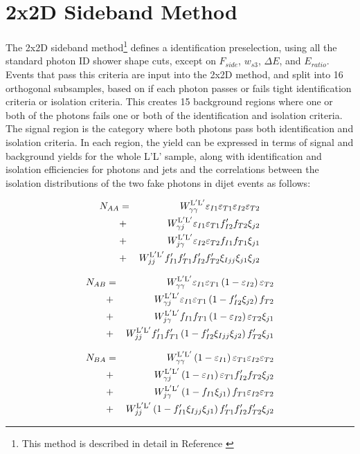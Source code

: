 \chapter{2x2D Sideband Method} \label{app:2x2d}

The 2x2D sideband method\footnote{This method is described in detail in Reference \cite{2x2d-definition}} defines a \LoosePrime identification preselection, using all the standard photon ID shower shape cuts, except on $F_{side}$, $w_{s3}$, $\Delta E$, and $E_{ratio}$. Events that pass this criteria are input into the 2x2D method, and split into 16 orthogonal subsamples, based on if each photon passes or fails tight identification criteria or isolation criteria. This creates 15 background regions where one or both of the photons fails one or both of the identification and isolation criteria. The signal region is the category where both photons pass both identification and isolation criteria. In each region, the yield can be expressed in terms of signal and background yields for the whole L'L' sample, along with identification and isolation efficiencies for photons and jets and the correlations between the isolation distributions of the two fake photons in dijet events as follows:

\begin{eqnarray}
    N_{AA} &=& W_{\gamma\gamma}^{\mathrm{L}^{\prime}\mathrm{L}^{\prime}} \varepsilon_{I1} \varepsilon_{T1} \varepsilon_{I2} \varepsilon_{T2} \nonumber \\
    &+& W_{\gamma j}^{\mathrm{L}^{\prime}\mathrm{L}^{\prime}} \varepsilon_{I1} \varepsilon_{T1} f^{\prime}_{I2} f_{T2} \xi_{j2} \nonumber \\
    &+& W_{j \gamma}^{\mathrm{L}^{\prime}\mathrm{L}^{\prime}} \varepsilon_{I2} \varepsilon_{T2} f_{I1} f_{T1} \xi_{j1}  \nonumber \\
    &+& W_{jj}^{\mathrm{L}^{\prime}\mathrm{L}^{\prime}} f^{\prime}_{I1} f^{\prime}_{T1} f^{\prime}_{I2} f^{\prime}_{T2} \xi_{Ijj} \xi_{j1} \xi_{j2}
  \end{eqnarray}
  
  \begin{eqnarray}
    N_{AB} &=& W_{\gamma\gamma}^{\mathrm{L}^{\prime}\mathrm{L}^{\prime}} \varepsilon_{I1} \varepsilon_{T1} \left(1-\varepsilon_{I2}\right) \varepsilon_{T2} \nonumber \\
    &+& W_{\gamma j}^{\mathrm{L}^{\prime}\mathrm{L}^{\prime}}\varepsilon_{I1} \varepsilon_{T1}   \left(1-f^{\prime}_{I2} \xi_{j2}\right)f_{T2}   \nonumber \\
    &+& W_{j \gamma}^{\mathrm{L}^{\prime}\mathrm{L}^{\prime}}f_{I1} f_{T1} \left(1-\varepsilon_{I2} \right)\varepsilon_{T2}  \xi_{j1}  \nonumber \\
    &+& W_{jj}^{\mathrm{L}^{\prime}\mathrm{L}^{\prime}}f^{\prime}_{I1} f^{\prime}_{T1}\left(1-f^{\prime}_{I2}\xi_{Ijj} \xi_{j2}\right) f^{\prime}_{T2}\xi_{j1}
  \end{eqnarray}
  
  \begin{eqnarray}
    N_{BA} &=& W_{\gamma\gamma}^{\mathrm{L}^{\prime}\mathrm{L}^{\prime}} \left(1-\varepsilon_{I1}\right) \varepsilon_{T1} \varepsilon_{I2} \varepsilon_{T2} \nonumber \\
    &+& W_{\gamma j}^{\mathrm{L}^{\prime}\mathrm{L}^{\prime}}\left(1-\varepsilon_{I1} \right)\varepsilon_{T1} f^{\prime}_{I2} f_{T2}  \xi_{j2}   \nonumber \\
    &+& W_{j \gamma}^{\mathrm{L}^{\prime}\mathrm{L}^{\prime}} \left(1-f_{I1}  \xi_{j1}\right)f_{T1} \varepsilon_{I2} \varepsilon_{T2}   \nonumber \\
    &+& W_{jj}^{\mathrm{L}^{\prime}\mathrm{L}^{\prime}}\left(1-f^{\prime}_{I1}\xi_{Ijj}\xi_{j1}\right) f^{\prime}_{T1} f^{\prime}_{I2} f^{\prime}_{T2}\xi_{j2}
  \end{eqnarray}
  
